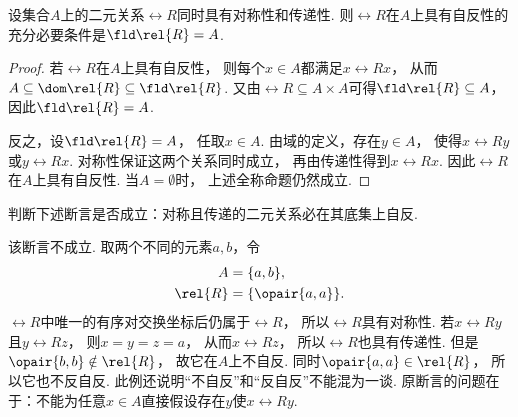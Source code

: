 \begin{proposition}
    设集合\(A\)上的二元关系\(\rel{R}\)同时具有对称性和传递性.
    则\(\rel{R}\)在\(A\)上具有自反性的充分必要条件是\(\fld\rel{R}=A\).
    \begin{proof}
        若\(\rel{R}\)在\(A\)上具有自反性，
        则每个\(x\in A\)都满足\(x\rel{R}x\)，
        从而\(A\subseteq\dom\rel{R}\subseteq\fld\rel{R}\).
        又由\(\rel{R}\subseteq A\times A\)可得\(\fld\rel{R}\subseteq A\)，
        因此\(\fld\rel{R}=A\).

        反之，设\(\fld\rel{R}=A\)，
        任取\(x\in A\).
        由域的定义，存在\(y\in A\)，
        使得\(x\rel{R}y\)或\(y\rel{R}x\).
        对称性保证这两个关系同时成立，
        再由传递性得到\(x\rel{R}x\).
        因此\(\rel{R}\)在\(A\)上具有自反性.
        当\(A=\emptyset\)时，
        上述全称命题仍然成立.
    \end{proof}
\end{proposition}

\begin{example}
    判断下述断言是否成立：对称且传递的二元关系必在其底集上自反.
    \begin{solution}
        该断言不成立.
        取两个不同的元素\(a,b\)，令
        \begin{align*}
            A&=\{a,b\},\\
            \rel{R}&=\{\opair{a,a}\}.
        \end{align*}
        \(\rel{R}\)中唯一的有序对交换坐标后仍属于\(\rel{R}\)，
        所以\(\rel{R}\)具有对称性.
        若\(x\rel{R}y\)且\(y\rel{R}z\)，
        则\(x=y=z=a\)，
        从而\(x\rel{R}z\)，
        所以\(\rel{R}\)也具有传递性.
        但是\(\opair{b,b}\notin\rel{R}\)，
        故它在\(A\)上不自反.
        同时\(\opair{a,a}\in\rel{R}\)，
        所以它也不反自反.
        此例还说明“不自反”和“反自反”不能混为一谈.
        原断言的问题在于：不能为任意\(x\in A\)直接假设存在\(y\)使\(x\rel{R}y\).
    \end{solution}
\end{example}

